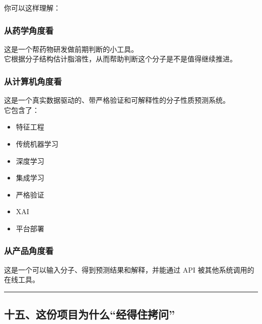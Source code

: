 \documentclass[
  ,
]{ctexart}
\providecommand{\tightlist}{%
  \setlength{\itemsep}{0pt}\setlength{\parskip}{0pt}}
\begin{document}
你可以这样理解：

\hypertarget{ux4eceux836fux5b66ux89d2ux5ea6ux770b}{%
\subsubsection{从药学角度看}\label{ux4eceux836fux5b66ux89d2ux5ea6ux770b}}

这是一个帮药物研发做前期判断的小工具。\\
它根据分子结构估计脂溶性，从而帮助判断这个分子是不是值得继续推进。

\hypertarget{ux4eceux8ba1ux7b97ux673aux89d2ux5ea6ux770b}{%
\subsubsection{从计算机角度看}\label{ux4eceux8ba1ux7b97ux673aux89d2ux5ea6ux770b}}

这是一个真实数据驱动的、带严格验证和可解释性的分子性质预测系统。\\
它包含了：

\begin{itemize}
\tightlist
\item
  特征工程
\item
  传统机器学习
\item
  深度学习
\item
  集成学习
\item
  严格验证
\item
  XAI
\item
  平台部署
\end{itemize}

\hypertarget{ux4eceux4ea7ux54c1ux89d2ux5ea6ux770b}{%
\subsubsection{从产品角度看}\label{ux4eceux4ea7ux54c1ux89d2ux5ea6ux770b}}

这是一个可以输入分子、得到预测结果和解释，并能通过 API
被其他系统调用的在线工具。

\begin{center}\rule{0.5\linewidth}{0.5pt}\end{center}

\hypertarget{ux5341ux4e94ux8fd9ux4efdux9879ux76eeux4e3aux4ec0ux4e48ux7ecfux5f97ux4f4fux62f7ux95ee}{%
\subsection{十五、这份项目为什么``经得住拷问''}\label{ux5341ux4e94ux8fd9ux4efdux9879ux76eeux4e3aux4ec0ux4e48ux7ecfux5f97ux4f4fux62f7ux95ee}}
\end{document}
